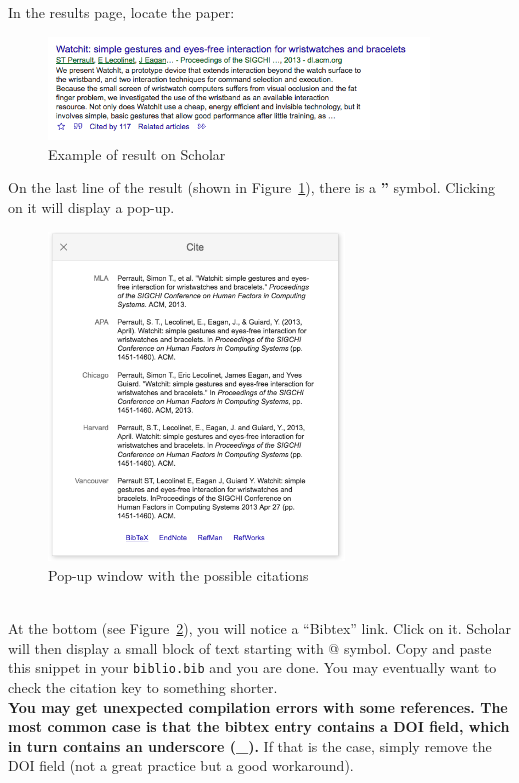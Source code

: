 In the results page, locate the paper:
\begin{figure}[!h]
  \centering
    \includegraphics[width=0.9\textwidth]{figures/scholarrefexample.png}
  \caption{Example of result on Scholar}
  \label{fig:scholarref}
\end{figure}

On the last line of the result (shown in Figure~\ref{fig:scholarref}), there is a \textbf{''} symbol.
Clicking on it will display a pop-up.
\begin{figure}[!h]
  \centering
    \includegraphics[width=0.7\textwidth]{figures/scholarpopup.png}
  \caption{Pop-up window with the possible citations}
  \label{fig:scholarpopup}
\end{figure}
\\

At the bottom (see Figure~\ref{fig:scholarpopup}), you will notice a ``Bibtex'' link. Click on it.
Scholar will then display a small block of text starting with @ symbol.
Copy and paste this snippet in your \texttt{biblio.bib} and you are done.
You may eventually want to check the citation key to something shorter.
\\

\textbf{You may get unexpected compilation errors with some references. The most common case is that the bibtex entry contains a DOI field, which in turn contains an underscore (\_).}
If that is the case, simply remove the DOI field (not a great practice but a good workaround).
